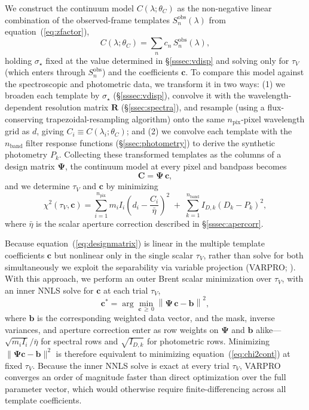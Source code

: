 \documentclass[modern,linenumbers]{aastex702}
\newcommand{\vdisp}{\ensuremath{\sigma_\star}}
\newcommand{\tauv}{\ensuremath{\tau_V}}
\begin{document}
We construct the continuum model $C(\lambda;\theta_C)$ as the
non-negative linear combination of the observed-frame templates
$S_n^\mathrm{obs}(\lambda)$ from equation~(\ref{eq:zfactor}),
\begin{equation}
  C(\lambda;\theta_C) = \sum_n c_n\,S_n^\mathrm{obs}(\lambda),
  \label{eq:ccont}
\end{equation}
holding \vdisp{} fixed at the value determined in \S\ref{sssec:vdisp}
and solving only for $\tauv$ (which enters through $S_n^\mathrm{obs}$)
and the coefficients $\mathbf{c}$. To compare this model against the
spectroscopic and photometric data, we transform it in two ways: (1)
we broaden each template by \vdisp{} (\S\ref{sssec:vdisp}), convolve
it with the wavelength-dependent resolution matrix $\mathbf{R}$
(\S\ref{ssec:spectra}), and resample (using a flux-conserving
trapezoidal-resampling algorithm) onto the same $n_\mathrm{pix}$-pixel
wavelength grid as $d$, giving $C_i \equiv C(\lambda_i;\theta_C)$; and
(2) we convolve each template with the $n_\mathrm{band}$ filter
response functions (\S\ref{ssec:photometry}) to derive the synthetic
photometry $P_k$. Collecting these transformed templates as the
columns of a design matrix $\boldsymbol{\Psi}$, the continuum model at
every pixel and bandpass becomes
\begin{equation}
  \mathbf{C} = \boldsymbol{\Psi}\,\mathbf{c},
  \label{eq:designmatrix}
\end{equation}
\noindent and we determine $\tauv$ and $\mathbf{c}$ by minimizing
\begin{equation}
  \chi^2(\tauv,\mathbf{c})
  =
  \sum_{i=1}^{n_\mathrm{pix}} m_i I_i\left(d_i - \frac{C_i}{\bar\eta}\right)^2
  \;+\;
  \sum_{k=1}^{n_\mathrm{band}} I_{D,k}\left(D_k - P_k\right)^2,
  \label{eq:chi2cont}
\end{equation}
where $\bar\eta$ is the scalar aperture correction described in
\S\ref{sssec:apercorr}.

Because equation~(\ref{eq:designmatrix}) is linear in the multiple
template coefficients $\mathbf{c}$ but nonlinear only in the single
scalar $\tauv$, rather than solve for both simultaneously we exploit
the separability via variable projection (VARPRO; \citealt{golub73a}).
With this approach, we perform an outer Brent scalar minimization over
$\tauv$, with an inner NNLS solve for $\mathbf{c}$ at each trial
$\tauv$,
\begin{equation}
  \mathbf{c}^* = \arg\min_{\mathbf{c}\,\geq\,0}
  \left\|\boldsymbol{\Psi}\,\mathbf{c} - \mathbf{b}\right\|^2,
  \label{eq:nnls}
\end{equation}
where $\mathbf{b}$ is the corresponding weighted data vector, and the
mask, inverse variances, and aperture correction enter as row weights
on $\boldsymbol{\Psi}$ and $\mathbf{b}$ alike---$\sqrt{m_i I_i}/\bar\eta$
for spectral rows and $\sqrt{I_{D,k}}$ for photometric rows. Minimizing
$\|\boldsymbol{\Psi}\mathbf{c}-\mathbf{b}\|^2$ is therefore equivalent
to minimizing equation~(\ref{eq:chi2cont}) at fixed $\tauv$. Because
the inner NNLS solve is exact at every trial $\tauv$, VARPRO converges
an order of magnitude faster than direct optimization over the full
parameter vector, which would otherwise require finite-differencing
across all template coefficients.
\end{document}
